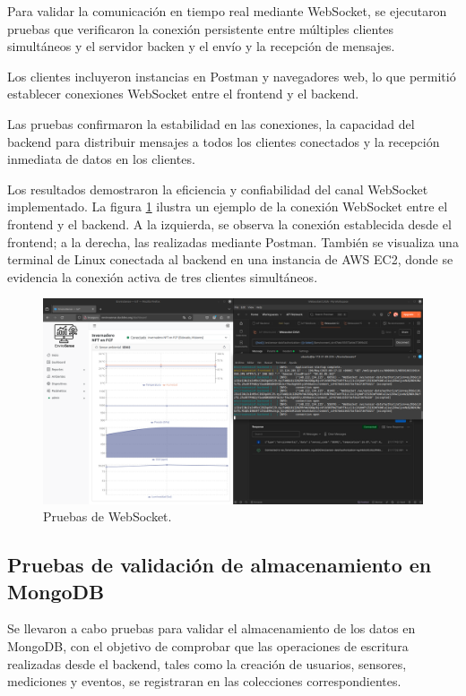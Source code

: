 Para validar la comunicación en tiempo real mediante WebSocket, se ejecutaron
pruebas que verificaron la conexión persistente entre múltiples clientes
simultáneos y el servidor backen y el envío y la recepción de mensajes.

Los clientes incluyeron instancias en Postman y navegadores web, lo que
permitió establecer conexiones WebSocket entre el frontend y el backend.

Las pruebas confirmaron la estabilidad en las conexiones, la capacidad del
backend para distribuir mensajes a todos los clientes conectados y la recepción
inmediata de datos en los clientes.

Los resultados demostraron la eficiencia y confiabilidad del canal WebSocket
implementado. La figura \ref{fig:websocket} ilustra un ejemplo de la conexión
WebSocket entre el frontend y el backend. A la izquierda, se observa la
conexión establecida desde el frontend; a la derecha, las realizadas mediante
Postman. También se visualiza una terminal de Linux conectada al backend en una
instancia de AWS EC2, donde se evidencia la conexión activa de tres clientes
simultáneos.

\begin{figure}[H]
    \centering
    \includegraphics[width=\textwidth]{Images/40_websocket.png}
    \caption[Pruebas de WebSocket]{Pruebas de WebSocket.}
    \label{fig:websocket}
\end{figure}

\subsection{Pruebas de validación de almacenamiento en MongoDB}

Se llevaron a cabo pruebas para validar el almacenamiento de los datos en
MongoDB, con el objetivo de comprobar que las operaciones de escritura
realizadas desde el backend, tales como la creación de usuarios, sensores,
mediciones y eventos, se registraran en las colecciones correspondientes.

